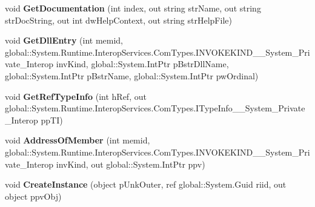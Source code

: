 \begin{DoxyCompactItemize}
void {\bfseries Get\+Documentation} (int index, out string str\+Name, out string str\+Doc\+String, out int dw\+Help\+Context, out string str\+Help\+File)
\item 
\mbox{\label{interface_system_1_1_runtime_1_1_interop_services_1_1_com_types_1_1_i_type_info_____system___private___interop_a943dffd3908114326ac1e08d036b2aa7}} 
void {\bfseries Get\+Dll\+Entry} (int memid, global\+::\+System.\+Runtime.\+Interop\+Services.\+Com\+Types.\+I\+N\+V\+O\+K\+E\+K\+I\+N\+D\+\_\+\+\_\+\+System\+\_\+\+Private\+\_\+\+Interop inv\+Kind, global\+::\+System.\+Int\+Ptr p\+Bstr\+Dll\+Name, global\+::\+System.\+Int\+Ptr p\+Bstr\+Name, global\+::\+System.\+Int\+Ptr pw\+Ordinal)
\item 
\mbox{\label{interface_system_1_1_runtime_1_1_interop_services_1_1_com_types_1_1_i_type_info_____system___private___interop_af4dec31689d92f94d3290424d918deaf}} 
void {\bfseries Get\+Ref\+Type\+Info} (int h\+Ref, out global\+::\+System.\+Runtime.\+Interop\+Services.\+Com\+Types.\+I\+Type\+Info\+\_\+\+\_\+\+System\+\_\+\+Private\+\_\+\+Interop pp\+TI)
\item 
\mbox{\label{interface_system_1_1_runtime_1_1_interop_services_1_1_com_types_1_1_i_type_info_____system___private___interop_ac1887de5b20a5e26671bbe3eea33a1e0}} 
void {\bfseries Address\+Of\+Member} (int memid, global\+::\+System.\+Runtime.\+Interop\+Services.\+Com\+Types.\+I\+N\+V\+O\+K\+E\+K\+I\+N\+D\+\_\+\+\_\+\+System\+\_\+\+Private\+\_\+\+Interop inv\+Kind, out global\+::\+System.\+Int\+Ptr ppv)
\item 
\mbox{\label{interface_system_1_1_runtime_1_1_interop_services_1_1_com_types_1_1_i_type_info_____system___private___interop_a3761e8c27250fe83496741af259e32b2}} 
void {\bfseries Create\+Instance} (object p\+Unk\+Outer, ref global\+::\+System.\+Guid riid, out object ppv\+Obj)
\item 
\mbox{\label{interface_system_1_1_runtime_1_1_interop_services_1_1_com_types_1_1_i_type_info_____system___private___interop_ad7930f0f8850b675844658850a360028}} 

\end{DoxyCompactItemize}
